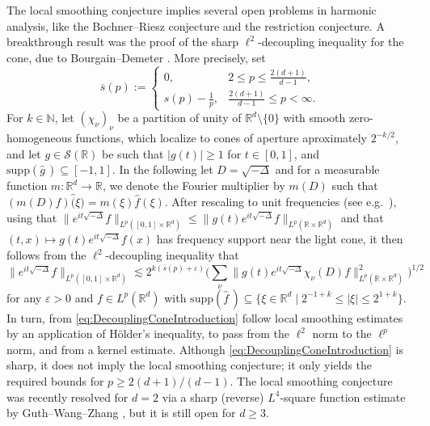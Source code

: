 \documentclass{amsart}
\theoremstyle{definition}
\newcommand{\R}{\mathbb{R}}
\newcommand{\N}{\mathbb{N}}
\newcommand {\Rd}{\mathbb{R}^{d}}
\newcommand {\supp}{\mathrm{supp}}
\newcommand{\wh}{\widehat}
\newcommand {\Sw}{\mathcal{S}}
\newcommand {\veps}{\varepsilon}
\numberwithin{equation}{section}
\begin{document}
The local smoothing conjecture implies several open problems in harmonic analysis, like the Bochner--Riesz conjecture and the restriction conjecture. A breakthrough result was the proof of the sharp $\ell^2$-decoupling inequality for the cone, due to Bourgain--Demeter \cite{BourgainDemeter2015}. More precisely, set  
\[
\overline{s}(p):= 
\begin{cases}
0,& 2 \leq p \leq \frac{2(d+1)}{d-1},\\
s(p) - \frac{1}{p},&\frac{2(d+1)}{d-1} \leq p < \infty.
\end{cases}
\]
For $k\in\N$, let $(\chi_\nu)_{\nu}$ be a partition of unity of $\Rd\setminus \{0\}$ with smooth zero-homogeneous functions, which localize to cones of aperture aproximately $2^{-k/2}$, and let $g\in\Sw(\R)$ be such that $|g(t)|\geq 1$ for $t\in[0,1]$, and $\supp(\wh{g}\,)\subseteq[-1,1]$. In the following let $D = \sqrt{- \Delta}$ and for a measurable function $m: \R^d \to \R$, we denote the Fourier multiplier by $m(D)$ such that $(m(D) f) \widehat (\xi) = m(\xi) \hat{f}(\xi)$. After rescaling to unit frequencies (see e.g.~\cite[Section~3]{BeltranHickmanSogge2020}), using that $\|e^{it\sqrt{-\Delta}}f\|_{L^{p}([0,1]\times\Rd)}\leq \|g(t)e^{it\sqrt{-\Delta}}f\|_{L^{p}(\R\times\Rd)}$ and that $(t,x)\mapsto g(t)e^{it\sqrt{-\Delta}}f(x)$ has frequency support near the light cone, it then follows from the $\ell^{2}$-decoupling inequality \cite[Theorem~1.2]{BourgainDemeter2015} that
\begin{equation}
\label{eq:DecouplingConeIntroduction}
\|e^{it \sqrt{- \Delta}}f \|_{L^p([0,1]\times \Rd)} \lesssim 2^{k(\overline{s}(p) + \varepsilon)} \Big(\sum_\nu \|g(t)e^{it \sqrt{- \Delta}} \chi_\nu(D) f \|^2_{L^p(\R\times\Rd)} \Big)^{1/2}
\end{equation}
for any $\veps>0$ and $f\in L^{p}(\Rd)$ with $\supp(\wh{f}\,)\subseteq \{\xi\in\Rd\mid 2^{-1+k}\leq |\xi|\leq 2^{1+k}\}$.  
In turn, from \eqref{eq:DecouplingConeIntroduction} follow local smoothing estimates by an application of H\"older's inequality, to pass from the $\ell^2$ norm  to the $\ell^p$ norm, and from a kernel estimate. 
Although \eqref{eq:DecouplingConeIntroduction} is sharp, it does not imply the local smoothing conjecture; it only yields the required bounds for $p\geq 2(d+1)/(d-1)$. The local smoothing conjecture was recently resolved for $d=2$ 
via a sharp (reverse) $L^4$-square function estimate by Guth--Wang--Zhang \cite{GuthWangZhang2020}, but it is still open for $d\geq 3$. 
\end{document}
